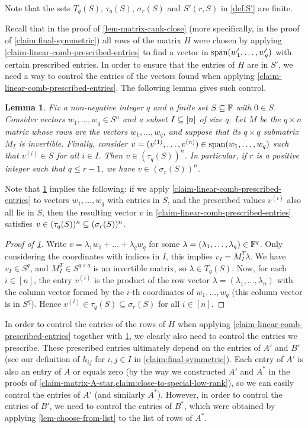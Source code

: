 \documentclass{daj}
\theoremstyle{plain}
\theoremstyle{plain}
\newtheorem{lem}[thm]{Lemma}
\theoremstyle{plain}
\theoremstyle{plain}
\theoremstyle{definition}
\theoremstyle{plain}
\theoremstyle{plain}
\theoremstyle{definition}
\theoremstyle{definition}
\theoremstyle{plain}
\begin{document}
Note that the sets $T_q(S)$, $\tau_q(S)$, $\sigma_r(S)$ and $S'(r,S)$ in \cref{def:S'} are finite.

Recall that in the proof of \cref{lem-matrix-rank-close} (more specifically, in the proof of \cref{claim:final-symmetric}) all rows of the matrix $H$ were chosen by applying \cref{claim-linear-comb-prescribed-entries} to find a vector in $\operatorname{span}(w_1',\dots,w_q')$ with certain prescribed entries. In order to ensure that the entries of $H$ are in $S'$, we need a way to control the entries of the vectors found when applying \cref{claim-linear-comb-prescribed-entries}. The following lemma gives such control.

\begin{lem}\label{lem-lin-comb-in-tau}
Fix a non-negative integer $q$ and a finite set $S\subseteq \mathbb{F}$ with $0\in S$. Consider vectors $w_1,\dots,w_q\in S^n$ and a subset $I\subseteq [n]$ of size $q$. Let $M$ be the $q\times n$ matrix whose rows are the vectors $w_1,\dots,w_q$, and suppose that its $q\times q$ submatrix $M_I$ is invertible. Finally, consider $v=(v^{(1)},\dots, v^{(n)})\in \operatorname{span}(w_1,\dots,w_q)$ such that $v^{(i)}\in S$ for all $i\in I$. Then $v\in (\tau_q(S))^n$. In particular, if $r$ is a positive integer such that $q\leq r-1$, we have $v\in (\sigma_r(S))^n$.
\end{lem}

Note that \cref{lem-lin-comb-in-tau} implies the following: if we apply \cref{claim-linear-comb-prescribed-entries} to vectors $w_1,\dots,w_q$ with entries in $S$, and the prescribed values $v^{(i)}$ also all lie in $S$, then the resulting vector $v$ in \cref{claim-linear-comb-prescribed-entries} satisfies $v\in (\tau_q(S))^n\subseteq (\sigma_r(S))^n$.

\begin{proof}[Proof of \cref{lem-lin-comb-in-tau}]
Write $v=\lambda_1w_1+\dots+\lambda_qw_q$ for some $\lambda=(\lambda_1,\dots,\lambda_q)\in \mathbb{F}^q$. Only considering the coordinates with indices in $I$, this implies $v_I=M_I^T\lambda$. We have  $v_I\in S^q$, and $M_I^T\in S^{q\times q}$ is an invertible matrix, so $\lambda\in T_q(S)$. Now, for each $i\in [n]$, the entry $v^{(i)}$ is the product of the row vector $\lambda=(\lambda_1,\dots,\lambda_n)$ with the column vector formed by the $i$-th coordinates of $w_1,\dots,w_q$ (this column vector is in $S^q$). Hence $v^{(i)}\in \tau_q(S)\subseteq \sigma_r(S)$ for all $i\in [n]$.
\end{proof}

In order to control the entries of the rows of $H$ when applying \cref{claim-linear-comb-prescribed-entries} together with \cref{lem-lin-comb-in-tau}, we clearly also need to control the entries we prescribe. These prescribed entries ultimately depend on the entries of $A'$ and $B'$ (see our definition of $h_{ij}$ for $i,j\in I$ in \cref{claim:final-symmetric}). Each entry of $A'$ is also an entry of $A$ or equals zero (by the way we constructed $A'$ and $A^*$ in the proofs of \cref{claim-matrix-A-star,claim:close-to-special-low-rank}), so we can easily control the entries of $A'$ (and similarly $A^*$). However, in order to control the entries of $B'$, we need to control the entries of $B^*$, which were obtained by applying \cref{lem-choose-from-list} to the list of rows of $A^*$.
\end{document}
